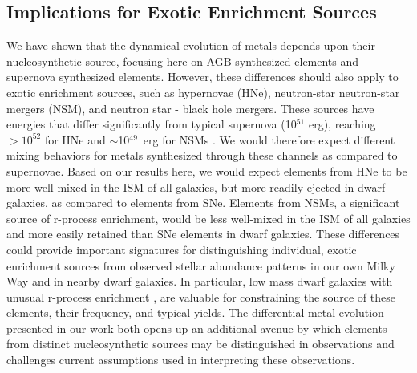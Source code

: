 \documentclass[twocolumn]{aastex61}
\begin{document}


%
%
\subsection{Implications for Exotic Enrichment Sources}
\label{sec:exotic enrichment}
We have shown that the dynamical evolution of metals depends upon their nucleosynthetic source, focusing here on AGB synthesized elements and supernova synthesized elements. However, these differences should also apply to exotic enrichment sources, such as hypernovae (HNe), neutron-star neutron-star mergers (NSM), and neutron star - black hole mergers. These sources have energies that differ significantly from typical supernova (10$^{51}$ erg), reaching $> 10^{52}$ for HNe \citep{Nomoto2004} and $\sim$10$^{49}$~erg for NSMs \citep{Goriely2011}. We would therefore expect different mixing behaviors for metals synthesized through these channels as compared to supernovae. Based on our results here, we would expect elements from HNe to be more well mixed in the ISM of all galaxies, but more readily ejected in dwarf galaxies, as compared to elements from SNe. Elements from NSMs, a significant source of r-process enrichment, would be less well-mixed in the ISM of all galaxies and more easily retained than SNe elements in dwarf galaxies. These differences could provide important signatures for distinguishing individual, exotic enrichment sources from observed stellar abundance patterns in our own Milky Way and in nearby dwarf galaxies. In particular, low mass dwarf galaxies with unusual r-process enrichment \citep[e.g.][]{Ji2015}, are valuable for constraining the source of these elements, their frequency, and typical yields. The differential metal evolution presented in our work both opens up an additional avenue by which elements from distinct nucleosynthetic sources may be distinguished in observations and challenges current assumptions used in interpreting these observations. 



\end{document}
